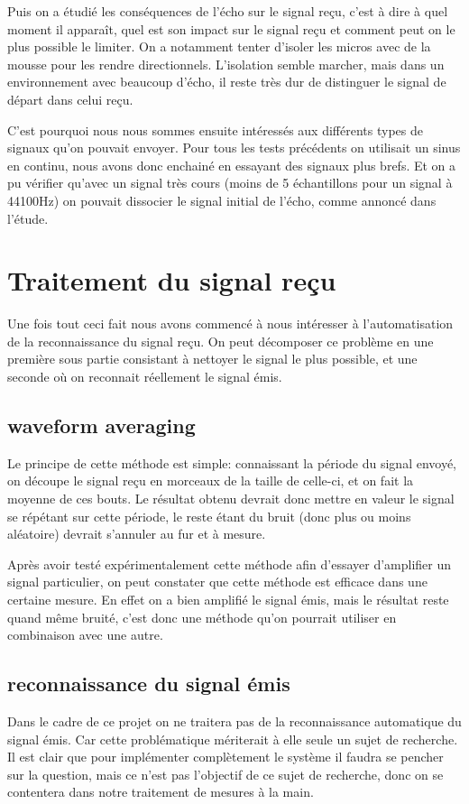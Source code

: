 \documentclass[12pt,a4paper]{report}
\begin{document}
Puis on a étudié les conséquences de l'écho sur le signal reçu, c'est à dire à quel moment il apparaît, quel est son impact sur le signal reçu et comment peut on le plus possible le limiter. On a notamment tenter d'isoler les micros avec de la mousse pour les rendre directionnels. L'isolation semble marcher, mais dans un environnement avec beaucoup d'écho, il reste très dur de distinguer le signal de départ dans celui reçu.

C'est pourquoi nous nous sommes ensuite intéressés aux différents types de signaux qu'on pouvait envoyer. Pour tous les tests précédents on utilisait un sinus en continu, nous avons donc enchainé en essayant des signaux plus brefs. Et on a pu vérifier qu'avec un signal très cours (moins de 5 échantillons pour un signal à 44100Hz) on pouvait dissocier le signal initial de l'écho, comme annoncé dans l'étude. 

\section{Traitement du signal reçu}

Une fois tout ceci fait nous avons commencé à nous intéresser à l'automatisation de la reconnaissance du signal reçu. On peut décomposer ce problème en une première sous partie consistant à nettoyer le signal le plus possible, et une seconde où on reconnait réellement le signal émis.
\subsection{waveform averaging}
Le principe de cette méthode est simple: connaissant la période du signal envoyé, on découpe le signal reçu en morceaux de la taille de celle-ci, et on fait la moyenne de ces bouts. Le résultat obtenu devrait donc mettre en valeur le signal se répétant sur cette période, le reste étant du bruit (donc plus ou moins aléatoire) devrait s'annuler au fur et à mesure.

Après avoir testé expérimentalement cette méthode afin d'essayer d'amplifier un signal particulier, on peut constater que cette méthode est efficace dans une certaine mesure. En effet on a bien amplifié le signal émis, mais le résultat reste quand même bruité, c'est donc une méthode qu'on pourrait utiliser en combinaison avec une autre.


\subsection{reconnaissance du signal émis}
Dans le cadre de ce projet on ne traitera pas de la reconnaissance automatique du signal émis. Car cette problématique mériterait à elle seule un sujet de recherche. Il est clair que pour implémenter complètement le système il faudra se pencher sur la question, mais ce n'est pas l'objectif de ce sujet de recherche, donc on se contentera dans notre traitement de mesures à la main.
\end{document}
